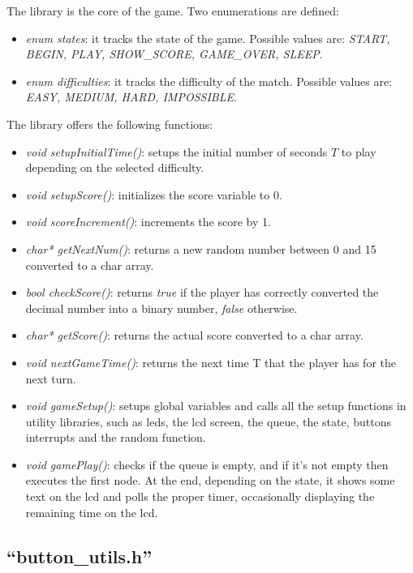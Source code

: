 \documentclass[a4paper,12pt]{report}
\begin{document}
    The library is the core of the game.
    \newline
    \newline
    Two enumerations are defined:
    \begin{itemize}
        \item \textit{enum states}: it tracks the state of the game. Possible values are: \textit{START, BEGIN, PLAY, SHOW\_SCORE, GAME\_OVER, SLEEP}.
        \item \textit{enum difficulties}: it tracks the difficulty of the match. Possible values are: \textit{EASY, MEDIUM, HARD, IMPOSSIBLE}.
    \end{itemize}
    The library offers the following functions:
    \begin{itemize}
        \item \textit{void setupInitialTime()}: setups the initial number of seconds $T$ to play depending on the selected difficulty. 
        \item \textit{void setupScore()}: initializes the score variable to 0. 
        \item \textit{void scoreIncrement()}: increments the score by 1. 
        \item \textit{char* getNextNum()}: returns a new random number between 0 and 15 converted to a char array. 
        \item \textit{bool checkScore()}: returns \textit{true} if the player has correctly converted the decimal number into a binary number, \textit{false} otherwise. 
        \item \textit{char* getScore()}: returns the actual score converted to a char array. 
        \item \textit{void nextGameTime()}: returns the next time T that the player has for the next turn.  
        \item \textit{void gameSetup()}: setups global variables and calls all the setup functions in utility libraries, such as leds, the lcd screen, the queue, the state, buttons interrupts and the random function. 
        \item \textit{void gamePlay()}: checks if the queue is empty, and if it's not empty then executes the first node. At the end, depending on the state, it shows some text on the lcd and polls the proper timer, occasionally displaying the remaining time on the lcd. 
    \end{itemize}
    
    \subsection{``button\_utils.h''}
\end{document}
